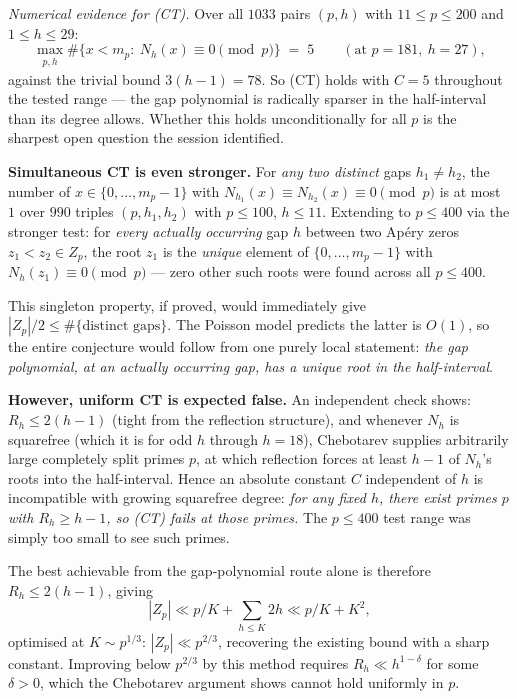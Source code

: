 \emph{Numerical evidence for (CT).}  Over all $1033$ pairs $(p,h)$ with $11\le p\le200$ and
$1\le h\le29$:
\[
  \max_{\substack{p,h}}\#\{x<m_p:\ N_h(x)\equiv0\pmod p\}\;=\;5
  \qquad(\text{at }p=181,\ h=27),
\]
against the trivial bound $3(h-1)=78$.  So (CT) holds with $C=5$ throughout the tested range —
the gap polynomial is radically sparser in the half-interval than its degree allows.  Whether this
holds unconditionally for all $p$ is the sharpest open question the session identified.

\medskip
\noindent\textbf{Simultaneous CT is even stronger.}  For \emph{any two distinct} gaps $h_1\ne h_2$,
the number of $x\in\{0,\ldots,m_p-1\}$ with $N_{h_1}(x)\equiv N_{h_2}(x)\equiv0\pmod p$ is at
most $1$ over $990$ triples $(p,h_1,h_2)$ with $p\le100$, $h\le11$.  Extending to $p\le400$
via the stronger test: for \emph{every actually occurring} gap $h$ between two Ap\'ery zeros
$z_1<z_2\in Z_p$, the root $z_1$ is the \emph{unique} element of $\{0,\ldots,m_p-1\}$ with
$N_h(z_1)\equiv0\pmod p$ — zero other such roots were found across all $p\le400$.

This singleton property, if proved, would immediately give $|Z_p|/2\le\#\{\text{distinct
gaps}\}$.  The Poisson model predicts the latter is $O(1)$, so the entire conjecture would
follow from one purely local statement: \emph{the gap polynomial, at an actually occurring gap,
has a unique root in the half-interval}.

\textbf{However, uniform CT is expected false.}  An independent check shows:
$R_h\le2(h-1)$ (tight from the reflection structure), and whenever $N_h$ is squarefree (which it
is for odd $h$ through $h=18$), Chebotarev supplies arbitrarily large completely split primes $p$,
at which reflection forces at least $h-1$ of $N_h$'s roots into the half-interval.  Hence an
absolute constant $C$ independent of $h$ is incompatible with growing squarefree degree: \emph{for
any fixed $h$, there exist primes $p$ with $R_h\ge h-1$, so (CT) fails at those primes.}  The
$p\le400$ test range was simply too small to see such primes.

The best achievable from the gap-polynomial route alone is therefore $R_h\le2(h-1)$, giving
\[
  |Z_p|\ll p/K+\sum_{h\le K}2h\ll p/K+K^2,
\]
optimised at $K\sim p^{1/3}$: $|Z_p|\ll p^{2/3}$, recovering the existing bound with a sharp
constant.  Improving below $p^{2/3}$ by this method requires $R_h\ll h^{1-\delta}$ for some
$\delta>0$, which the Chebotarev argument shows cannot hold uniformly in $p$.

